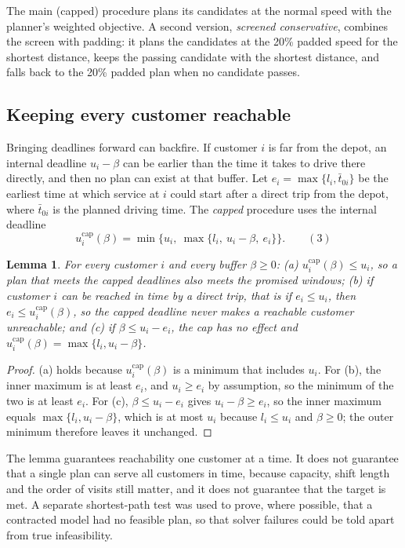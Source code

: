 \documentclass[12pt,letterpaper]{article}
\newtheorem{lemma}{Lemma}
\begin{document}
The main (capped) procedure plans its candidates at the normal speed with the
planner's weighted objective. A second version, \emph{screened conservative},
combines the screen with padding: it plans the candidates at the 20\% padded speed
for the shortest distance, keeps the passing candidate with the shortest distance,
and falls back to the 20\% padded plan when no candidate passes.

\subsection{Keeping every customer reachable}

Bringing deadlines forward can backfire. If customer $i$ is far from the depot, an
internal deadline $u_i-\beta$ can be earlier than the time it takes to drive there
directly, and then no plan can exist at that buffer. Let
$e_i=\max\{l_i,\bar t_{0i}\}$ be the earliest time at which service at $i$ could
start after a direct trip from the depot, where $\bar t_{0i}$ is the planned
driving time. The \emph{capped} procedure uses the internal deadline
\begin{equation}
 u_i^{\mathrm{cap}}(\beta)=\min\bigl\{u_i,\ \max\{l_i,\ u_i-\beta,\ e_i\}\bigr\}.
 \qquad(3)
\end{equation}

\begin{lemma}\label{lem:cap}
For every customer $i$ and every buffer $\beta\ge0$:
(a) $u_i^{\mathrm{cap}}(\beta)\le u_i$, so a plan that meets the capped deadlines
also meets the promised windows;
(b) if customer $i$ can be reached in time by a direct trip, that is if
$e_i\le u_i$, then $e_i\le u_i^{\mathrm{cap}}(\beta)$, so the capped deadline never
makes a reachable customer unreachable; and
(c) if $\beta\le u_i-e_i$, the cap has no effect and
$u_i^{\mathrm{cap}}(\beta)=\max\{l_i,u_i-\beta\}$.
\end{lemma}

\begin{proof}
(a) holds because $u_i^{\mathrm{cap}}(\beta)$ is a minimum that includes $u_i$.
For (b), the inner maximum is at least $e_i$, and $u_i\ge e_i$ by assumption, so the
minimum of the two is at least $e_i$. For (c), $\beta\le u_i-e_i$ gives
$u_i-\beta\ge e_i$, so the inner maximum equals $\max\{l_i,u_i-\beta\}$, which is
at most $u_i$ because $l_i\le u_i$ and $\beta\ge0$; the outer minimum therefore
leaves it unchanged.
\end{proof}

The lemma guarantees reachability one customer at a time. It does not guarantee
that a single plan can serve all customers in time, because capacity, shift length
and the order of visits still matter, and it does not guarantee that the target is
met. A separate shortest-path test was used to prove, where possible, that a
contracted model had no feasible plan, so that solver failures could be told apart
from true infeasibility.
\end{document}
